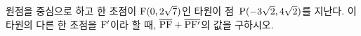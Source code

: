 원점을 중심으로 하고 한 초점이 $\mathrm{F}(0{,}\mkern3mu\mathopen{}2\sqrt{7})$인 타원이 점~$\mathrm{P}(-3\sqrt{2}{,}\mkern3mu\mathopen{}4\sqrt{2})$를 지난다. 이 타원의 다른 한 초점을 $\mathrm{F}'$이라 할 때, $\overline{\mathrm{PF}}+\overline{\mathrm{PF'}}$의 값을 구하시오.
